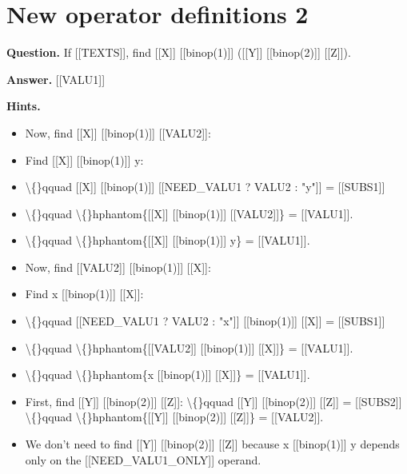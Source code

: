 \documentclass{article}
\begin{document}
\section*{New operator definitions 2}
\textbf{Question.} If [[TEXTS]], find [[X]] [[binop(1)]] ([[Y]] [[binop(2)]] [[Z]]).

\textbf{Answer.} [[VALU1]]

\textbf{Hints.}
\begin{itemize}
  \item Now, find [[X]] [[binop(1)]] [[VALU2]]:
  \item Find [[X]] [[binop(1)]] y:
  \item \textbackslash\{\}qquad [[X]] [[binop(1)]] [[NEED\_VALU1 ? VALU2 : "y"]] = [[SUBS1]]
  \item \textbackslash\{\}qquad \textbackslash\{\}hphantom\{[[X]] [[binop(1)]] [[VALU2]]\} = [[VALU1]].
  \item \textbackslash\{\}qquad \textbackslash\{\}hphantom\{[[X]] [[binop(1)]] y\} = [[VALU1]].
  \item Now, find [[VALU2]] [[binop(1)]] [[X]]:
  \item Find x [[binop(1)]] [[X]]:
  \item \textbackslash\{\}qquad [[NEED\_VALU1 ? VALU2 : "x"]] [[binop(1)]] [[X]] = [[SUBS1]]
  \item \textbackslash\{\}qquad \textbackslash\{\}hphantom\{[[VALU2]] [[binop(1)]] [[X]]\} = [[VALU1]].
  \item \textbackslash\{\}qquad \textbackslash\{\}hphantom\{x [[binop(1)]] [[X]]\} = [[VALU1]].
  \item First, find [[Y]] [[binop(2)]] [[Z]]:
            \textbackslash\{\}qquad [[Y]] [[binop(2)]] [[Z]] = [[SUBS2]]
            \textbackslash\{\}qquad \textbackslash\{\}hphantom\{[[Y]] [[binop(2)]] [[Z]]\} = [[VALU2]].
  \item We don't need to find [[Y]] [[binop(2)]] [[Z]] because x [[binop(1)]] y depends only on the [[NEED\_VALU1\_ONLY]] operand.
\end{itemize}
\end{document}
